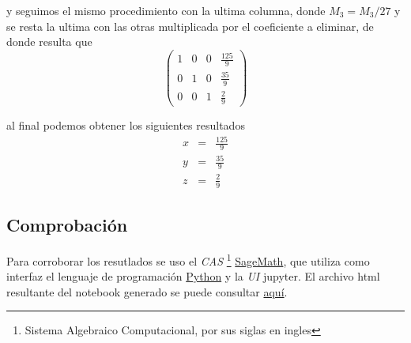 \documentclass[11pt]{article}
\begin{document}
\begin{multicols}{2}
\begin{enumerate}[\bf{Sistema} 1]
			y seguimos el mismo procedimiento con la ultima columna, donde $M_3 = M_3/27$ y se resta la ultima con las otras multiplicada por el coeficiente a eliminar, de donde resulta que
			$$\left(\begin{array}{rrrr}
				1 & 0 & 0 & \frac{125}{9} \\
				0 & 1 & 0 & \frac{35}{9} \\
				0 & 0 & 1 & \frac{2}{9}
			\end{array}\right)$$ 
			
			al final podemos obtener los siguientes resultados
			\begin{eqnarray*}
				x &=& \frac{125}{9} \\
				y &=& \frac{ 35}{9} \\
				z &=& \frac{  2}{9}
			\end{eqnarray*}	

	\end{enumerate}
\end{multicols}




	\subsection*{Comprobaci\'on}
	\par Para corroborar los resutlados se uso el \textit{CAS} 
\footnote{Sistema Algebraico Computacional, por sus siglas en ingles} 
	\href{https://www.sagemath.org/}{SageMath}, que utiliza como interfaz el lenguaje de programaci\'on \href{https://www.python.org/}{Python} y la \textit{UI} jupyter. El archivo html resultante del notebook generado se puede consultar \href{https://github.com/BenchHPZ/UnADM-Biotecnologia/blob/master/B1-1/AL/Actividades/BALI_U2_EA_BERC.ipynb}{aqu\'i}.
	
\end{document}
